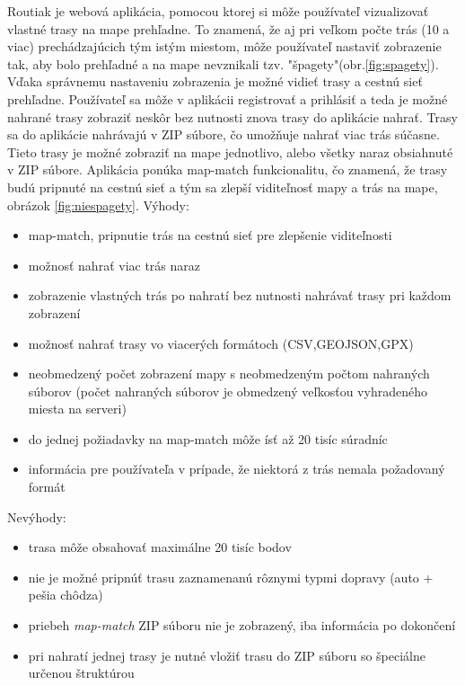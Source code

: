 \indent Routiak je webová aplikácia, pomocou ktorej si môže používateľ vizualizovať vlastné trasy na mape prehľadne. To znamená, že aj pri veľkom počte trás (10 a viac) prechádzajúcich tým istým miestom, môže používateľ nastaviť zobrazenie tak, aby bolo prehľadné a na mape nevznikali tzv. "špagety"(obr.\ref{fig:spagety}). Vďaka správnemu nastaveniu zobrazenia je možné vidieť trasy a cestnú sieť prehľadne. Používateľ sa môže v aplikácii registrovať a prihlásiť a teda je možné nahrané trasy zobraziť neskôr bez nutnosti znova trasy do aplikácie nahrať. Trasy sa do aplikácie nahrávajú v ZIP súbore, čo umožňuje nahrať viac trás súčasne. Tieto trasy je možné zobraziť na mape jednotlivo, alebo všetky naraz obsiahnuté v ZIP súbore. Aplikácia ponúka map-match funkcionalitu, čo znamená, že trasy budú pripnuté na cestnú sieť a tým sa zlepší viditeľnosť mapy a trás na mape, obrázok \ref{fig:niespagety}. 
\newline Výhody:
\begin{itemize}
  \item map-match, pripnutie trás na cestnú sieť pre zlepšenie viditeľnosti
  \item možnosť nahrať viac trás naraz
  \item zobrazenie vlastných trás po nahratí bez nutnosti nahrávať trasy pri každom zobrazení
  \item možnosť nahrať trasy vo viacerých formátoch (CSV,GEOJSON,GPX)
  \item neobmedzený počet zobrazení mapy s neobmedzeným počtom nahraných súborov (počet nahraných súborov je obmedzený veľkosťou vyhradeného miesta na serveri)
  \item do jednej požiadavky na map-match môže ísť až 20 tisíc súradníc
  \item informácia pre používateľa v prípade, že niektorá z trás nemala požadovaný formát 
\end{itemize}
Nevýhody:
\begin{itemize}
  \item trasa môže obsahovať maximálne 20 tisíc bodov
  \item nie je možné pripnúť trasu zaznamenanú rôznymi typmi dopravy (auto + pešia chôdza)
  \item priebeh \textit{map-match} ZIP súboru nie je zobrazený, iba informácia po dokončení
  \item pri nahratí jednej trasy je nutné vložiť trasu do ZIP súboru so špeciálne určenou štruktúrou
\end{itemize}
